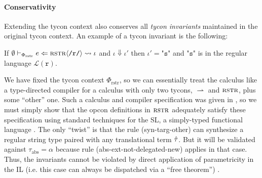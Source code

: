 
\paragraph{Conservativity} 
Extending the tycon context also conserves all \emph{tycon invariants} maintained in the original tycon context. An example of a tycon invariant is the following:

\begin{tyconinvariant}
If $\emptyset \vdash_{\Phi_\text{rstr}} e \Leftarrow {\textsc{rstr}}\langle\texttt{/r/}\rangle \leadsto \iota$ and $\iota \Downarrow \iota'$ then $\iota'=\texttt{"s"}$ and $\texttt{"s"}$ is in the regular language $\mathcal{L}(\texttt{r})$.
\end{tyconinvariant}
\begin{proof-sketch} We have fixed the tycon context $\Phi_\text{rstr}$, so we can essentially treat the calculus like a type-directed compiler for a calculus with only two tycons, $\rightharpoonup$ and $\textsc{rstr}$, plus some ``other'' one. Such a calculus and compiler specification was given in \cite{sanitation-psp14}, so we must simply show that the opcon definitions in $\textsc{rstr}$ adequately satisfy these specification using standard techniques for the SL, a simply-typed functional language \cite{conf/pldi/Chlipala07}. The only ``twist'' is that the rule (syn-targ-other) can synthesize a regular string type paired with any translational term $\hat{\tau}$. But it will be validated against $\tau_\text{abs}=\alpha$ because rule (abs-ext-not-delegated-new) applies in that case.  Thus, the invariants cannot be violated by direct application of parametricity in the IL (i.e. this case can always be dispatched via a ``free theorem'') \cite{WadlerThms}. \end{proof-sketch}

